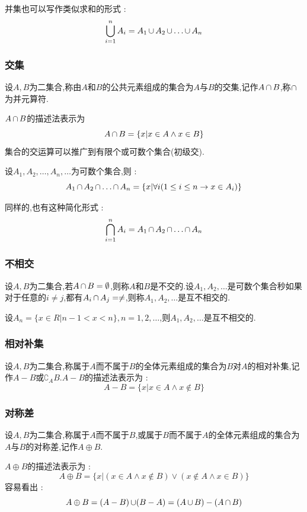 {{{{    并集也可以写作类似求和的形式 : $$
      \updownUnion{n}{i = 1}A_i = A_1 \unionSet A_2 \unionSet \dots \unionSet A_n
    $$

  }%

  \subsubsection{交集}{
    设$A,B$为二集合,称由$A$和$B$的公共元素组成的集合为$A$与$B$的交集,记作$A \intersectionSet B$,称$\intersectionSet$为并元算符.

    $A \intersectionSet B$的描述法表示为$$
      A \intersectionSet B = \{x | x \in A \land x \in B\}
    $$
    集合的交运算可以推广到有限个或可数个集合(初级交).

    设$A_1,A_2,\dots,A_n,\dots$为可数个集合,则 : $$
      A_1 \intersectionSet A_2 \intersectionSet \dots \intersectionSet A_n = \{x | \forall i (1 \leq i \leq n \to x \in A_i)\}
    $$

    同样的,也有这种简化形式 : $$
      \bigcap\limits_{i = 1}^{n}A_i = A_1 \intersectionSet A_2 \intersectionSet \dots \intersectionSet A_n
    $$
  }%

  \subsubsection{不相交}{
    设$A,B$为二集合,若$A \intersectionSet B = \emptyset$,则称$A$和$B$是不交的.设$A_1,A_2,\dots$是可数个集合秒如果对于任意的$i \neq j$,都有$A_i \intersectionSet A_j = \neq$,则称$A_1,A_2,\dots$是互不相交的.

    设$A_n = \{x \in R | n - 1 < x < n\},n = 1,2,\dots$,则$A_1,A_2,\dots$是互不相交的.
  }%

  \subsubsection{相对补集}{
    设$A,B$为二集合,称属于$A$而不属于$B$的全体元素组成的集合为$B$对$A$的相对补集,记作$A - B$或$\complement_A B$.$A - B$的描述法表示为 : $$
      A - B = \{x | x \in A \land x \notin B\}
    $$
  }%

  \subsubsection{对称差}{
    设$A,B$为二集合,称属于$A$而不属于$B$,或属于$B$而不属于$A$的全体元素组成的集合为$A$与$B$的对称差,记作$A \oplus B$.

    $A \oplus B$的描述法表示为 : $$
      A \oplus B = \{x | (x \in A \land x \notin B) \lor (x \notin A \land x \in B)\}
    $$
    容易看出 : $$
      A \oplus B = (A - B) \unionSet (B - A) = (A \unionSet B) - (A \intersectionSet B)
    $$
  }%

}}}
